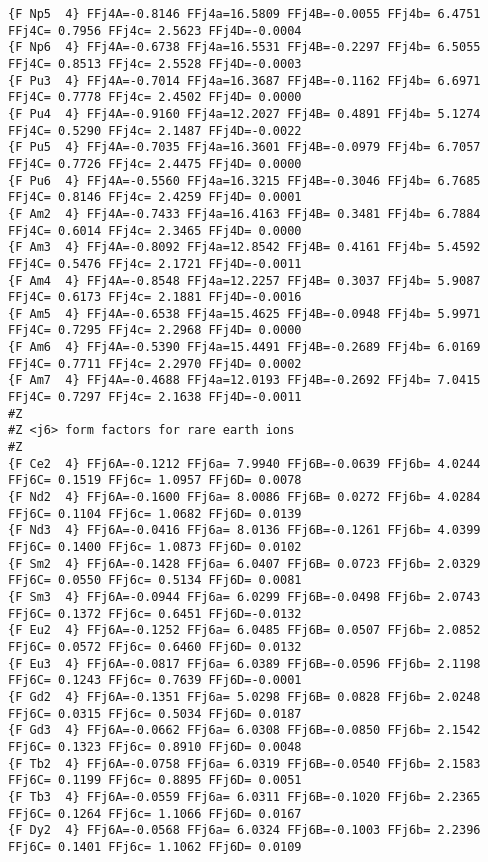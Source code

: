 {\begin{verbatim}
{F Np5  4} FFj4A=-0.8146 FFj4a=16.5809 FFj4B=-0.0055 FFj4b= 6.4751 FFj4C= 0.7956 FFj4c= 2.5623 FFj4D=-0.0004 
{F Np6  4} FFj4A=-0.6738 FFj4a=16.5531 FFj4B=-0.2297 FFj4b= 6.5055 FFj4C= 0.8513 FFj4c= 2.5528 FFj4D=-0.0003 
{F Pu3  4} FFj4A=-0.7014 FFj4a=16.3687 FFj4B=-0.1162 FFj4b= 6.6971 FFj4C= 0.7778 FFj4c= 2.4502 FFj4D= 0.0000 
{F Pu4  4} FFj4A=-0.9160 FFj4a=12.2027 FFj4B= 0.4891 FFj4b= 5.1274 FFj4C= 0.5290 FFj4c= 2.1487 FFj4D=-0.0022 
{F Pu5  4} FFj4A=-0.7035 FFj4a=16.3601 FFj4B=-0.0979 FFj4b= 6.7057 FFj4C= 0.7726 FFj4c= 2.4475 FFj4D= 0.0000 
{F Pu6  4} FFj4A=-0.5560 FFj4a=16.3215 FFj4B=-0.3046 FFj4b= 6.7685 FFj4C= 0.8146 FFj4c= 2.4259 FFj4D= 0.0001 
{F Am2  4} FFj4A=-0.7433 FFj4a=16.4163 FFj4B= 0.3481 FFj4b= 6.7884 FFj4C= 0.6014 FFj4c= 2.3465 FFj4D= 0.0000 
{F Am3  4} FFj4A=-0.8092 FFj4a=12.8542 FFj4B= 0.4161 FFj4b= 5.4592 FFj4C= 0.5476 FFj4c= 2.1721 FFj4D=-0.0011 
{F Am4  4} FFj4A=-0.8548 FFj4a=12.2257 FFj4B= 0.3037 FFj4b= 5.9087 FFj4C= 0.6173 FFj4c= 2.1881 FFj4D=-0.0016 
{F Am5  4} FFj4A=-0.6538 FFj4a=15.4625 FFj4B=-0.0948 FFj4b= 5.9971 FFj4C= 0.7295 FFj4c= 2.2968 FFj4D= 0.0000 
{F Am6  4} FFj4A=-0.5390 FFj4a=15.4491 FFj4B=-0.2689 FFj4b= 6.0169 FFj4C= 0.7711 FFj4c= 2.2970 FFj4D= 0.0002 
{F Am7  4} FFj4A=-0.4688 FFj4a=12.0193 FFj4B=-0.2692 FFj4b= 7.0415 FFj4C= 0.7297 FFj4c= 2.1638 FFj4D=-0.0011 
#Z
#Z <j6> form factors for rare earth ions
#Z
{F Ce2  4} FFj6A=-0.1212 FFj6a= 7.9940 FFj6B=-0.0639 FFj6b= 4.0244 FFj6C= 0.1519 FFj6c= 1.0957 FFj6D= 0.0078 
{F Nd2  4} FFj6A=-0.1600 FFj6a= 8.0086 FFj6B= 0.0272 FFj6b= 4.0284 FFj6C= 0.1104 FFj6c= 1.0682 FFj6D= 0.0139 
{F Nd3  4} FFj6A=-0.0416 FFj6a= 8.0136 FFj6B=-0.1261 FFj6b= 4.0399 FFj6C= 0.1400 FFj6c= 1.0873 FFj6D= 0.0102 
{F Sm2  4} FFj6A=-0.1428 FFj6a= 6.0407 FFj6B= 0.0723 FFj6b= 2.0329 FFj6C= 0.0550 FFj6c= 0.5134 FFj6D= 0.0081 
{F Sm3  4} FFj6A=-0.0944 FFj6a= 6.0299 FFj6B=-0.0498 FFj6b= 2.0743 FFj6C= 0.1372 FFj6c= 0.6451 FFj6D=-0.0132 
{F Eu2  4} FFj6A=-0.1252 FFj6a= 6.0485 FFj6B= 0.0507 FFj6b= 2.0852 FFj6C= 0.0572 FFj6c= 0.6460 FFj6D= 0.0132 
{F Eu3  4} FFj6A=-0.0817 FFj6a= 6.0389 FFj6B=-0.0596 FFj6b= 2.1198 FFj6C= 0.1243 FFj6c= 0.7639 FFj6D=-0.0001 
{F Gd2  4} FFj6A=-0.1351 FFj6a= 5.0298 FFj6B= 0.0828 FFj6b= 2.0248 FFj6C= 0.0315 FFj6c= 0.5034 FFj6D= 0.0187 
{F Gd3  4} FFj6A=-0.0662 FFj6a= 6.0308 FFj6B=-0.0850 FFj6b= 2.1542 FFj6C= 0.1323 FFj6c= 0.8910 FFj6D= 0.0048 
{F Tb2  4} FFj6A=-0.0758 FFj6a= 6.0319 FFj6B=-0.0540 FFj6b= 2.1583 FFj6C= 0.1199 FFj6c= 0.8895 FFj6D= 0.0051 
{F Tb3  4} FFj6A=-0.0559 FFj6a= 6.0311 FFj6B=-0.1020 FFj6b= 2.2365 FFj6C= 0.1264 FFj6c= 1.1066 FFj6D= 0.0167 
{F Dy2  4} FFj6A=-0.0568 FFj6a= 6.0324 FFj6B=-0.1003 FFj6b= 2.2396 FFj6C= 0.1401 FFj6c= 1.1062 FFj6D= 0.0109 

\end{verbatim}}
